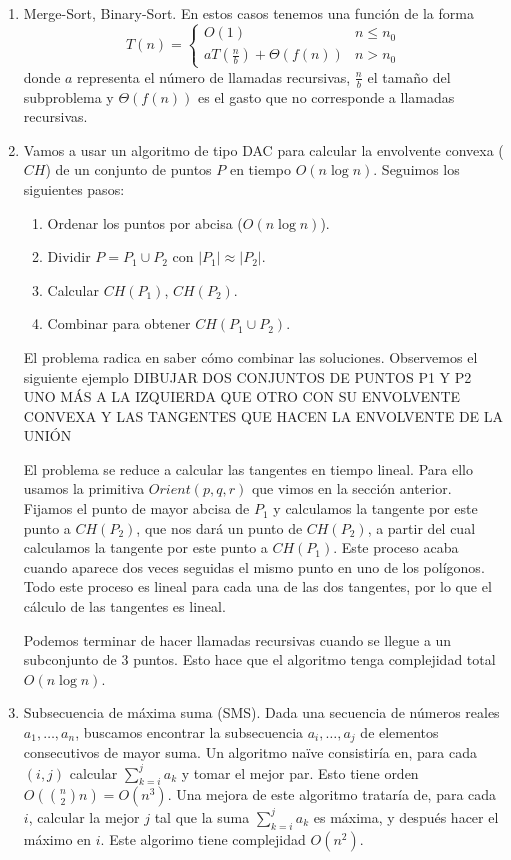\documentclass[AL.tex]{subfiles}
\begin{document}
\begin{ejs}\
\begin{enumerate}
\item Merge-Sort, Binary-Sort. En estos casos tenemos una función de la forma
\[
 T(n)=\begin{cases}
 O(1) & n\leq n_0\\
 aT\left(\frac{n}{b}\right)+\Theta(f(n)) & n>n_0
 \end{cases}
\]
donde $a$ representa el número de llamadas recursivas, $\frac{n}{b}$ el tamaño del subproblema y $\Theta(f(n))$ es el gasto que no corresponde a llamadas recursivas.
\item Vamos a usar un algoritmo de tipo DAC para calcular la envolvente convexa ($CH$) de un conjunto de puntos $P$ en tiempo $O(n\log n)$. Seguimos los siguientes pasos:
\begin{enumerate}
\item Ordenar los puntos por abcisa ($O(n\log n)$).
\item Dividir $P=P_1\cup P_2$ con $|P_1|\approx|P_2|$.
\item Calcular $CH(P_1)$, $CH(P_2)$.
\item Combinar para obtener $CH(P_1\cup P_2)$. 
\end{enumerate}

El problema radica en saber cómo combinar las soluciones. Observemos el siguiente ejemplo DIBUJAR DOS CONJUNTOS DE PUNTOS P1 Y P2 UNO MÁS A LA IZQUIERDA QUE OTRO CON SU ENVOLVENTE CONVEXA Y LAS TANGENTES QUE HACEN LA ENVOLVENTE DE LA UNIÓN

El problema se reduce a calcular las tangentes en tiempo lineal. Para ello usamos la primitiva $Orient(p,q,r)$ que vimos en la sección anterior. Fijamos el punto de mayor abcisa de $P_1$ y calculamos la tangente por este punto a $CH(P_2)$, que nos dará un punto de $CH(P_2)$, a partir del cual calculamos la tangente por este punto a $CH(P_1)$. Este proceso acaba cuando aparece dos veces seguidas el mismo punto en uno de los polígonos. Todo este proceso es lineal para cada una de las dos tangentes, por lo que el cálculo de las tangentes es lineal.

Podemos terminar de hacer llamadas recursivas cuando se llegue a un subconjunto de 3 puntos. Esto hace que el algoritmo tenga complejidad total $O(n\log n)$.  


\item Subsecuencia de máxima suma (SMS). Dada una secuencia de números reales $a_1,\dots, a_n$, buscamos encontrar la subsecuencia $a_i,\dots, a_j$ de elementos consecutivos de mayor suma. Un algoritmo naïve consistiría en, para cada $(i,j)$ calcular $\sum_{k=i}^ja_k$ y tomar el mejor par. Esto tiene orden $O(\binom{n}{2}n)=O(n^3)$. Una mejora de este algoritmo trataría de, para cada $i$, calcular la mejor $j$ tal que la suma $\sum_{k=i}^ja_k$ es máxima, y después hacer el máximo en $i$. Este algorimo tiene complejidad $O(n^2)$. 


\end{enumerate}
\end{ejs}
\end{document}
